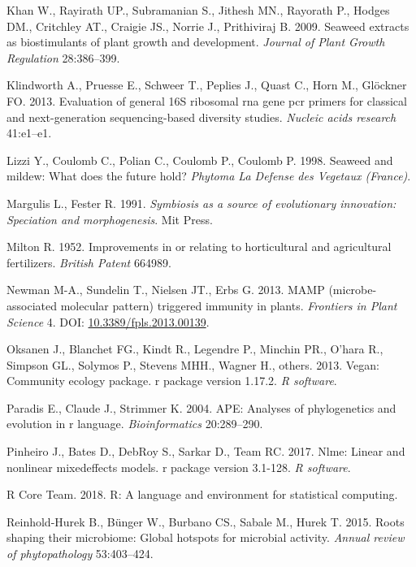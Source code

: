 \documentclass[12pt,]{article}
\begin{document}
\hypertarget{ref-khan2009seaweed}{}
Khan W., Rayirath UP., Subramanian S., Jithesh MN., Rayorath P., Hodges
DM., Critchley AT., Craigie JS., Norrie J., Prithiviraj B. 2009. Seaweed
extracts as biostimulants of plant growth and development. \emph{Journal
of Plant Growth Regulation} 28:386--399.

\hypertarget{ref-klindworth2013evaluation}{}
Klindworth A., Pruesse E., Schweer T., Peplies J., Quast C., Horn M.,
Glöckner FO. 2013. Evaluation of general 16S ribosomal rna gene pcr
primers for classical and next-generation sequencing-based diversity
studies. \emph{Nucleic acids research} 41:e1--e1.

\hypertarget{ref-lizzi1998seaweed}{}
Lizzi Y., Coulomb C., Polian C., Coulomb P., Coulomb P. 1998. Seaweed
and mildew: What does the future hold? \emph{Phytoma La Defense des
Vegetaux (France)}.

\hypertarget{ref-margulis1991symbiosis}{}
Margulis L., Fester R. 1991. \emph{Symbiosis as a source of evolutionary
innovation: Speciation and morphogenesis}. Mit Press.

\hypertarget{ref-milton1952improvements}{}
Milton R. 1952. Improvements in or relating to horticultural and
agricultural fertilizers. \emph{British Patent} 664989.

\hypertarget{ref-Newman2013}{}
Newman M-A., Sundelin T., Nielsen JT., Erbs G. 2013. MAMP
(microbe-associated molecular pattern) triggered immunity in plants.
\emph{Frontiers in Plant Science} 4. DOI:
\href{https://doi.org/10.3389/fpls.2013.00139}{10.3389/fpls.2013.00139}.

\hypertarget{ref-oksanen2013package}{}
Oksanen J., Blanchet FG., Kindt R., Legendre P., Minchin PR., O'hara R.,
Simpson GL., Solymos P., Stevens MHH., Wagner H., others. 2013. Vegan:
Community ecology package. r package version 1.17.2. \emph{R software}.

\hypertarget{ref-paradis2004ape}{}
Paradis E., Claude J., Strimmer K. 2004. APE: Analyses of phylogenetics
and evolution in r language. \emph{Bioinformatics} 20:289--290.

\hypertarget{ref-pinheiro2017nlme}{}
Pinheiro J., Bates D., DebRoy S., Sarkar D., Team RC. 2017. Nlme: Linear
and nonlinear mixedeffects models. r package version 3.1-128. \emph{R
software}.

\hypertarget{ref-team2018r}{}
R Core Team. 2018. R: A language and environment for statistical
computing.

\hypertarget{ref-reinhold2015roots}{}
Reinhold-Hurek B., Bünger W., Burbano CS., Sabale M., Hurek T. 2015.
Roots shaping their microbiome: Global hotspots for microbial activity.
\emph{Annual review of phytopathology} 53:403--424.
\end{document}
